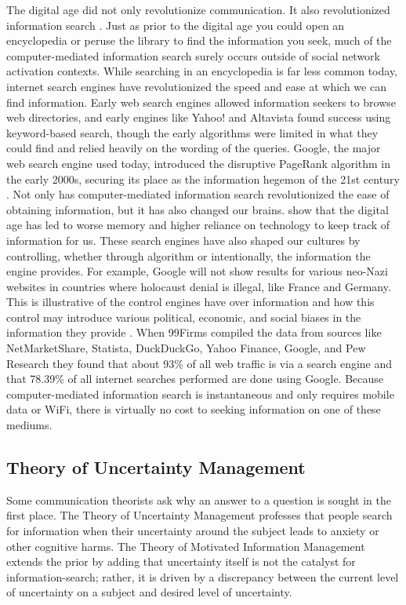 The digital age did not only revolutionize communication. It also
revolutionized information search \citep{ramirez2002information}. Just as prior
to the digital age you could open an encyclopedia or peruse the library to find
the information you seek, much of the computer-mediated information search
surely occurs outside of social network activation contexts. While searching in
an encyclopedia is far less common today, internet search engines have
revolutionized the speed and ease at which we can find information. Early web
search engines allowed information seekers to browse web directories, and early
engines like Yahoo! and Altavista found success using keyword-based search,
though the early algorithms were limited in what they could find and relied
heavily on the wording of the queries. Google, the major web search engine used
today, introduced the disruptive PageRank algorithm in the early 2000s, securing
its place as the information hegemon of the 21st century
\citep{brin1998anatomy}. Not only has computer-mediated information search
revolutionized the ease of obtaining information, but it has also changed our
brains. \citet{sparrow2011google} show that the digital age has led to worse
memory and higher reliance on technology to keep track of information for us.
These search engines have also shaped our cultures by controlling, whether
through algorithm or intentionally, the information the engine provides. For
example, Google will not show results for various neo-Nazi websites in countries
where holocaust denial is illegal, like France and Germany. This is illustrative
of the control engines have over information and how this control may introduce
various political, economic, and social biases in the information they provide
\citep{segev2010google}. When 99Firms \citeyearpar{99firms22} compiled the data
from sources like NetMarketShare, Statista, DuckDuckGo, Yahoo Finance, Google,
and Pew Research they found that about 93\% of all web traffic is
via a search engine and that 78.39\% of all internet searches performed are done
using Google. Because computer-mediated information search is instantaneous 
and only requires mobile data or WiFi, there is virtually no cost to seeking
information on one of these mediums.

\subsection{Theory of Uncertainty Management}

Some communication theorists ask why an answer to a question is sought in the
first place. The Theory of Uncertainty Management
\citep{brashersCommunicationUncertaintyManagement2001} professes that people
search for information when their uncertainty around the subject leads to
anxiety or other cognitive harms. The Theory of Motivated Information Management
\citep{afifiSeekingInformationSexual2006, afifiTheoryMotivatedInformation2004}
extends the prior by adding that uncertainty itself is not the catalyst for
information-search; rather, it is driven by a discrepancy between the current
level of uncertainty on a subject and desired level of uncertainty.

